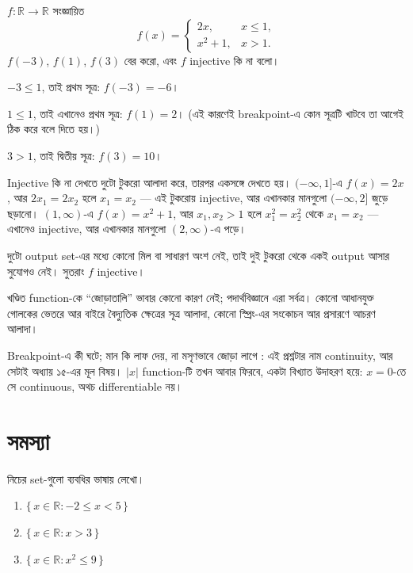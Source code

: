 \documentclass[11pt]{article}
\begin{document}
\begin{example}
$f \colon \mathbb{R} \to \mathbb{R}$ সংজ্ঞায়িত
\[
  f(x) =
  \begin{cases}
    2x, & x \leq 1, \\[2pt]
    x^2 + 1, & x > 1 .
  \end{cases}
\]
$f(-3)$, $f(1)$, $f(3)$ বের করো, এবং $f$ injective কি না বলো।
\end{example}

\begin{solbox}
$-3 \leq 1$, তাই প্রথম সূত্র: $f(-3) = -6$।

$1 \leq 1$, তাই এখানেও প্রথম সূত্র: $f(1) = 2$। (এই কারণেই breakpoint-এ
কোন সূত্রটি খাটবে তা আগেই ঠিক করে বলে দিতে হয়।)

$3 > 1$, তাই দ্বিতীয় সূত্র: $f(3) = 10$।

Injective কি না দেখতে দুটো টুকরো আলাদা করে, তারপর একসঙ্গে দেখতে হয়।
$(-\infty, 1]$-এ $f(x) = 2x$, আর $2x_1 = 2x_2$ হলে $x_1 = x_2$ --- এই টুকরোয়
injective, আর এখানকার মানগুলো $(-\infty, 2]$ জুড়ে ছড়ানো। $(1, \infty)$-এ
$f(x) = x^2 + 1$, আর $x_1, x_2 > 1$ হলে $x_1^2 = x_2^2$ থেকে $x_1 = x_2$ ---
এখানেও injective, আর এখানকার মানগুলো $(2, \infty)$-এ পড়ে।

দুটো output set-এর মধ্যে কোনো মিল বা সাধারণ অংশ নেই, তাই দুই টুকরো থেকে একই output আসার
সুযোগও নেই। সুতরাং $f$ injective।
\end{solbox}

\begin{remark}
খণ্ডিত function-কে ``জোড়াতালি'' ভাবার কোনো কারণ নেই; পদার্থবিজ্ঞানে এরা
সর্বত্র। কোনো আধানযুক্ত গোলকের ভেতরে আর বাইরে বৈদ্যুতিক ক্ষেত্রের সূত্র
আলাদা, কোনো স্প্রিং-এর সংকোচন আর প্রসারণে আচরণ আলাদা।

Breakpoint-এ কী ঘটে; মান কি লাফ দেয়, না মসৃণভাবে জোড়া লাগে : এই
প্রশ্নটার নাম continuity, আর সেটাই অধ্যায় ১৫-এর মূল বিষয়। $|x|$
function-টি তখন আবার ফিরবে, একটা বিখ্যাত উদাহরণ হয়ে: $x = 0$-তে সে
continuous, অথচ differentiable নয়।
\end{remark}


\section{সমস্যা}

 নিচের set-গুলো ব্যবধির ভাষায় লেখো।
\begin{enumerate}
  \item $\{\, x \in \mathbb{R} : -2 \leq x < 5 \,\}$
  \item $\{\, x \in \mathbb{R} : x > 3 \,\}$
  \item $\{\, x \in \mathbb{R} : x^2 \leq 9 \,\}$
\end{enumerate}
\end{document}
